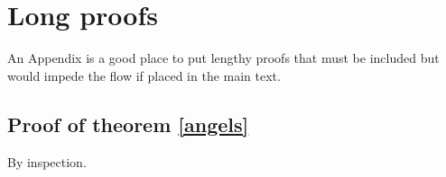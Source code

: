 \chapter{Long proofs}\label{app:proofs} An Appendix is a good place
to put lengthy proofs that must be included but would impede the
flow if placed in the main text.
\section{Proof of theorem \ref{angels}}\label{pf:angels}
By inspection.
